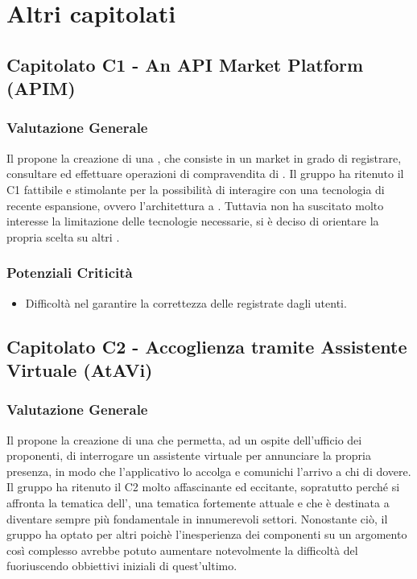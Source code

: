 \section{Altri capitolati}
  \subsection{Capitolato C1 - An API Market Platform (APIM)}
    \subsubsection{Valutazione Generale}
    Il  propone la creazione di una , che consiste in un  market in grado di registrare, consultare ed effettuare operazioni di compravendita di .
    Il gruppo ha ritenuto il  C1 fattibile e stimolante per la possibilità di interagire con una tecnologia di recente espansione, ovvero l'architettura a . Tuttavia non ha suscitato molto interesse la limitazione delle tecnologie necessarie, si è deciso di orientare la propria scelta su altri .
    \subsubsection{Potenziali Criticità}
     \begin{itemize}
      \item Difficoltà nel garantire la correttezza delle  registrate dagli utenti.
     \end{itemize}
  \subsection{Capitolato C2 - Accoglienza tramite Assistente Virtuale (AtAVi)}
    \subsubsection{Valutazione Generale}
    Il  propone la creazione di una  che permetta, ad un ospite dell'ufficio dei proponenti, di interrogare un assistente virtuale per annunciare la propria presenza, in modo che l'applicativo lo accolga e comunichi l'arrivo a chi di dovere.
    Il gruppo ha ritenuto il  C2 molto affascinante ed eccitante, sopratutto perché si affronta la tematica dell', una tematica fortemente attuale e che è destinata a diventare sempre più fondamentale in innumerevoli settori. Nonostante ciò, il gruppo ha optato per altri  poichè l'inesperienza dei componenti su un argomento così complesso avrebbe potuto aumentare notevolmente la difficoltà del  fuoriuscendo obbiettivi iniziali di quest'ultimo.
